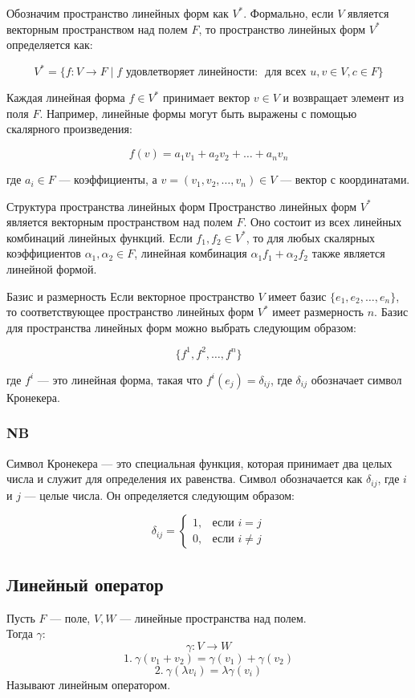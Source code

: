 Обозначим пространство линейных форм как $V^*$. Формально, если $V$ является векторным пространством над полем $F$, то пространство линейных форм $V^*$ определяется как:

\[
V^* = \{ f: V \to F \mid f \text{ удовлетворяет линейности: } \text{ для всех } u, v \in V, c \in F \}
\]

Каждая линейная форма $f \in V^*$ принимает вектор $v \in V$ и возвращает элемент из поля $F$. Например, линейные формы могут быть выражены с помощью скалярного произведения:

\[
f(v) = a_1 v_1 + a_2 v_2 + \ldots + a_n v_n
\]

где $a_i \in F$ — коэффициенты, а $v = (v_1, v_2, \ldots, v_n) \in V$ — вектор с координатами. 

 Структура пространства линейных форм
Пространство линейных форм $V^*$ является векторным пространством над полем $F$. Оно состоит из всех линейных комбинаций линейных функций. Если $f_1, f_2 \in V^*$, то для любых скалярных коэффициентов $\alpha_1, \alpha_2 \in F$, линейная комбинация $\alpha_1 f_1 + \alpha_2 f_2$ также является линейной формой.

 Базис и размерность
Если векторное пространство $V$ имеет базис $\{e_1, e_2, \ldots, e_n\}$, то соответствующее пространство линейных форм $V^*$ имеет размерность $n$. Базис для пространства линейных форм можно выбрать следующим образом:

\[
\{f^1, f^2, \ldots, f^n\}
\]

где $f^i$ — это линейная форма, такая что $f^i(e_j) = \delta_{ij}$, где $\delta_{ij}$ обозначает символ Кронекера.

\subsubsection*{NB}
Символ Кронекера — это специальная функция, которая принимает два целых числа и служит для определения их равенства. Символ обозначается как $\delta_{ij}$, где $i$ и $j$ — целые числа. Он определяется следующим образом:

\[
\delta_{ij} = 
\begin{cases}
1, & \text{если } i = j \\ 
0, & \text{если } i \neq j
\end{cases}
\]

\subsection{Линейный оператор}
Пусть $F$ --- поле, $V,W$ --- линейные пространства над полем.\\
Тогда $\gamma$:
\[
\gamma : V \to W
\]
\[
1. \ \gamma(v_1 + v_2) = \gamma(v_1) + \gamma(v_2)
\]
\[
2. \ \gamma(\lambda v_i) = \lambda \gamma(v_i)
\]
Называют линейным оператором.

